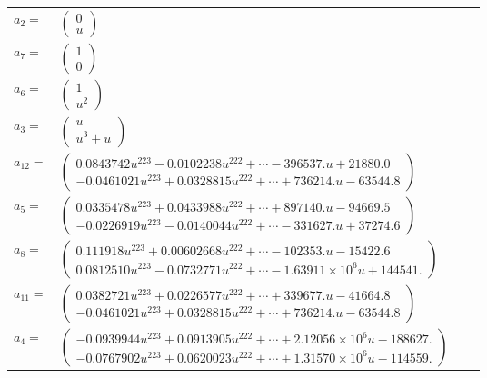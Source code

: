 \documentclass[1p]{elsarticle_modified}
\theoremstyle{definition}
\begin{document}
\begin{tabular}{m{7pt} m{180pt} m{7pt} m{180pt} }
\flushright $a_{2}=$&$\begin{pmatrix}0\\u\end{pmatrix}$ \\
\flushright $a_{7}=$&$\begin{pmatrix}1\\0\end{pmatrix}$ \\
\flushright $a_{6}=$&$\begin{pmatrix}1\\u^2\end{pmatrix}$ \\
\flushright $a_{3}=$&$\begin{pmatrix}u\\u^3+u\end{pmatrix}$ \\
\flushright $a_{12}=$&$\begin{pmatrix}0.0843742 u^{223}-0.0102238 u^{222}+\cdots-396537. u+21880.0\\-0.0461021 u^{223}+0.0328815 u^{222}+\cdots+736214. u-63544.8\end{pmatrix}$ \\
\flushright $a_{5}=$&$\begin{pmatrix}0.0335478 u^{223}+0.0433988 u^{222}+\cdots+897140. u-94669.5\\-0.0226919 u^{223}-0.0140044 u^{222}+\cdots-331627. u+37274.6\end{pmatrix}$ \\
\flushright $a_{8}=$&$\begin{pmatrix}0.111918 u^{223}+0.00602668 u^{222}+\cdots-102353. u-15422.6\\0.0812510 u^{223}-0.0732771 u^{222}+\cdots-1.63911\times10^{6} u+144541.\end{pmatrix}$ \\
\flushright $a_{11}=$&$\begin{pmatrix}0.0382721 u^{223}+0.0226577 u^{222}+\cdots+339677. u-41664.8\\-0.0461021 u^{223}+0.0328815 u^{222}+\cdots+736214. u-63544.8\end{pmatrix}$ \\
\flushright $a_{4}=$&$\begin{pmatrix}-0.0939944 u^{223}+0.0913905 u^{222}+\cdots+2.12056\times10^{6} u-188627.\\-0.0767902 u^{223}+0.0620023 u^{222}+\cdots+1.31570\times10^{6} u-114559.\end{pmatrix}$ \\

\end{tabular}
\end{document}
